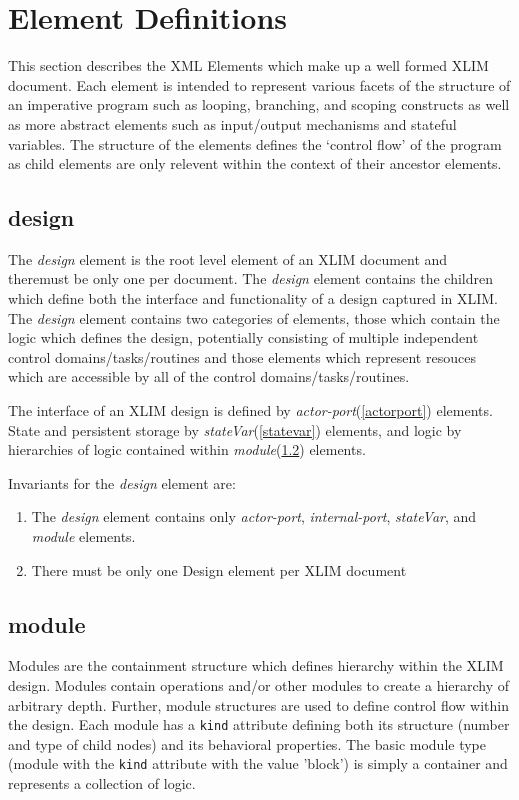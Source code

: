 
\chapter{Element Definitions}\label{elementdefs}
This section describes the XML Elements which make up a well formed XLIM document.  Each element is intended to represent various facets of the structure of an imperative program such as looping, branching, and scoping constructs as well as more abstract elements such as input/output mechanisms and stateful variables.  The structure of the elements defines the `control flow' of the program as child elements are only relevent within the context of their ancestor elements.  

\section{design}
The {\it design} element is the root level element of an XLIM document and theremust be only one per document.  The {\it design} element contains the children which define both the interface and functionality of a design captured in XLIM.  The {\it design} element contains two categories of elements, those which contain the logic which defines the design, potentially consisting of multiple independent control domains/tasks/routines and those elements which represent resouces which are accessible by all of the control domains/tasks/routines.  

The interface of an XLIM design is defined by {\it actor-port}(\ref{actorport}) elements.  State and persistent storage by {\it stateVar}(\ref{statevar}) elements, and logic by hierarchies of logic contained within {\it module}(\ref{module}) elements.

Invariants for the {\it design} element are:\\
\begin{enumerate}
\item The {\it design} element contains only {\it actor-port}, {\it internal-port}, {\it stateVar}, and {\it module} elements.
\item There must be only one Design element per XLIM document
\end{enumerate}

\section{module}\label{module}
Modules are the containment structure which defines hierarchy within the XLIM design.  Modules contain operations and/or other modules to create a hierarchy of arbitrary depth.  Further, module structures are used to define control flow within the design.  Each module has a {\tt kind} attribute defining both its structure (number and type of child nodes) and its behavioral properties.  The basic module type (module with the {\tt kind} attribute with the value 'block') is simply a container and represents a collection of logic.


